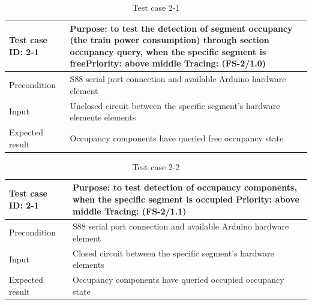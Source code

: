 \begin{table}[H]
	\caption{Test case 2-1}
	\label{table:TCase-FS2-1}
	\begin{center}
		\renewcommand{\arraystretch}{1.8}
		\begin{tabu} 
			to 0.9 \textwidth
			{  X[0.4, c] X[c] }
			\toprule
			Test case ID: 2-1 & Purpose: to test the detection of segment occupancy (the train power consumption) through section occupancy query, when the specific segment is free\newline Priority: above middle \newline Tracing: (FS-2/1.0) \\ \midrule
			Precondition      & S88 serial port connection and available Arduino hardware element                                                                                                                                                \\
			Input             & Unclosed circuit between the specific segment's hardware elements elements                                                                                                                                       \\
			Expected result   & Occupancy components have queried free occupancy state                                                                                                                                                           \\ \bottomrule
		\end{tabu}
	\end{center}
\end{table} 

\begin{table}[H]
	\caption{Test case 2-2}
	\label{table:TCase-FS2-2}
	\begin{center}
		\renewcommand{\arraystretch}{1.8}
		\begin{tabu} 
			to 0.9 \textwidth
			{  X[0.4, c] X[c] }
			\toprule
			Test case ID: 2-1 & Purpose: to test detection of occupancy components, when the specific segment is occupied \newline Priority: above middle \newline Tracing: (FS-2/1.1) \\ \midrule
			Precondition      & S88 serial port connection and available Arduino hardware element                                                                                      \\
			Input             & Closed circuit between the specific segment's hardware elements                                                                                        \\
			Expected result   & Occupancy components have queried occupied occupancy state                                                                                             \\ \bottomrule
		\end{tabu}
	\end{center}
\end{table} 

